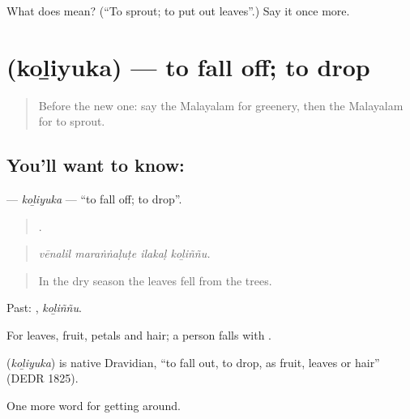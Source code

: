 \begin{tcolorbox}[breakable,colback=teal!4,colframe=teal!35!black,title={Before you move on}]
What does  mean? (\textquotedblleft{}To sprout; to put out leaves\textquotedblright{}.) Say it once more.
\end{tcolorbox}
\section[\texorpdfstring{\ml{കൊഴിയുക} (koḻiyuka)}{കൊഴിയുക (koḻiyuka)}]{ (koḻiyuka) — to fall off; to drop}

\label{lesson:ML-C502-koliyuka}



\begin{quote}
Before the new one: say the Malayalam for greenery, then the Malayalam for to sprout.
\end{quote}

\subsection*{You'll want to know: }
\textbf{} — \emph{koḻiyuka} — \textquotedblleft{}to fall off; to drop\textquotedblright{}.

\begin{quote}
   .
\end{quote}

\begin{quote}
\emph{vēnalil maraṅṅaḷuṭe ilakaḷ koḻiññu.}
\end{quote}

\begin{quote}
In the dry season the leaves fell from the trees.
\end{quote}

Past: , \emph{koḻiññu}.

For leaves, fruit, petals and hair; a person falls with .

\begin{cousinweb}
\textbf{} (\emph{koḻiyuka}) is native Dravidian, \textquotedblleft{}to fall out, to drop, as fruit, leaves or hair\textquotedblright{} (DEDR 1825).
\end{cousinweb}

\begin{grammarlens}[title={What you've built}]
One more word for getting around.
\end{grammarlens}


